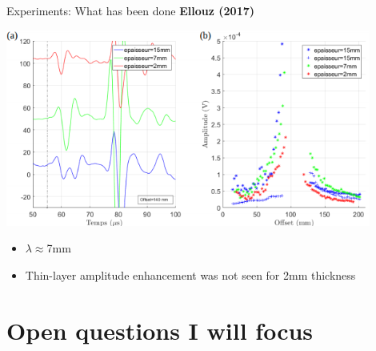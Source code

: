\documentclass[utf8]{beamer} \usetheme{lfcr} %
\begin{document}
%
\begin{frame}{Experiments: What has been done}
  {\textbf{Ellouz (2017)}}

  \begin{center}
    \vspace*{2.5cm}
    \includegraphics[width=0.9\textwidth]{ellouz2017_2}%
  \end{center}

  \begin{itemize}
    \item $\lambda \approx $7mm
    \item Thin-layer amplitude enhancement was not seen for 2mm thickness
     
  \end{itemize}

\end{frame}
%
\section{Open questions I will focus}
\end{document}
